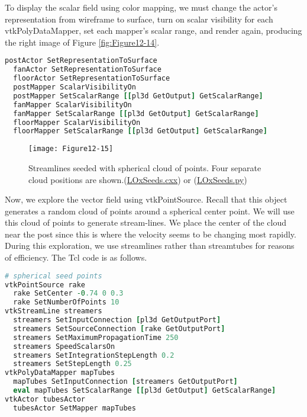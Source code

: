 To display the scalar field using color mapping, we must change the
actor's representation from wireframe to surface, turn on scalar
visibility for each vtkPolyDataMapper, set each mapper's scalar
range, and render again, producing the right image of Figure \ref{fig:Figure12-14}.

\begin{lstlisting}[language=TCL, caption={Dicplay the scalar field.}]
  postActor SetRepresentationToSurface
  fanActor SetRepresentationToSurface
  floorActor SetRepresentationToSurface
  postMapper ScalarVisibilityOn
  postMapper SetScalarRange [[pl3d GetOutput] GetScalarRange]
  fanMapper ScalarVisibilityOn
  fanMapper SetScalarRange [[pl3d GetOutput] GetScalarRange]
  floorMapper ScalarVisibilityOn
  floorMapper SetScalarRange [[pl3d GetOutput] GetScalarRange]
\end{lstlisting}

\begin{figure}[!htb]
	\centering
	\texttt{[image: Figure12-15]}
	\caption{Streamlines seeded with spherical cloud of points. Four separate cloud positions are shown.(\href{https://lorensen.github.io/VTKExamples/site/Cxx/VisualizationAlgorithms/LOxSeeds/}{LOxSeeds.cxx}) or (\href{https://lorensen.github.io/VTKExamples/site/Python/VisualizationAlgorithms/LOxSeeds/}{LOxSeeds.py})}
	\label{fig:Figure12-15}
\end{figure}


Now, we explore the vector field using vtkPointSource.
Recall that this object generates a random cloud of points around a spherical center point.
We will use this cloud of points to generate stream-lines.
We place the center of the cloud near the post since this is where the velocity seems to be changing most rapidly.
During this exploration, we use streamlines rather than streamtubes for reasons of efficiency.
The Tcl code is as follows.

\begin{lstlisting}[language=TCL, caption={Explore the vector field using a point source.}]
# spherical seed points
vtkPointSource rake
  rake SetCenter -0.74 0 0.3
  rake SetNumberOfPoints 10
vtkStreamLine streamers
  streamers SetInputConnection [pl3d GetOutputPort]
  streamers SetSourceConnection [rake GetOutputPort]
  streamers SetMaximumPropagationTime 250
  streamers SpeedScalarsOn
  streamers SetIntegrationStepLength 0.2
  streamers SetStepLength 0.25
vtkPolyDataMapper mapTubes
  mapTubes SetInputConnection [streamers GetOutputPort]
  eval mapTubes SetScalarRange [[pl3d GetOutput] GetScalarRange]
vtkActor tubesActor
  tubesActor SetMapper mapTubes
\end{lstlisting}

